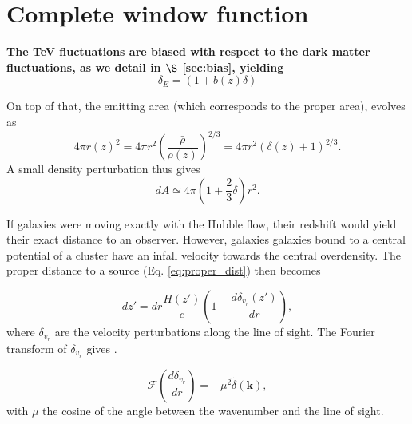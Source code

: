 \documentclass[twocolumns]{emulateapj}
\newcommand\ALc[1]{{\color{red} \bf #1}} %
\begin{document}
\section{Complete window function}
 \ALc{
The TeV fluctuations are biased with respect to the dark matter fluctuations, as we detail in $\S$ \ref{sec:bias}, yielding 
\begin{equation}
  \delta_E=(1+b(z)\delta)
\label{eq:bias}
\end{equation}

On top of that, the emitting area (which corresponds to the proper area), evolves as
  \begin{equation}
    \label{eq:emitting_area}
4\pi r(z)^2=4\pi r^2\left(\frac{\bar{\rho}}{\rho(z)}\right)^{2/3}=4\pi r^2(\delta(z)+1)^{2/3}.
  \end{equation}
A small density perturbation thus gives
\begin{equation}
  \label{eq:pert_area}
dA\simeq 4\pi \left(1+\frac{2}{3}\delta\right)r^2.
\end{equation}

If galaxies were moving exactly with the Hubble flow, their redshift would yield their exact distance to an observer. However, galaxies galaxies bound to a central potential of a cluster have an infall velocity towards the central overdensity. The proper distance to a source  (Eq. \ref{eq:proper_dist}) then becomes

  \begin{equation}
    \label{eq:vel_perturb}
    dz'=dr\frac{H(z')}{c}\left(1-\frac{d\delta_{v_r}(z')}{dr}\right),
  \end{equation}
where $\delta_{v_r}$ are the velocity perturbations along the line of sight. The Fourier transform of $\delta_{v_r}$ gives  \citep{1987MNRAS.227....1K}.

\begin{equation}
  \label{eq:kaiser2}
  \mathcal{F}\left(\frac{d\delta_{v_r}}{dr}\right)=-\mu^2\tilde{\delta}(\mathbf{k}),
\end{equation}
with $\mu$ the cosine of the angle between the wavenumber and the line of sight.
}


%
\end{document}
